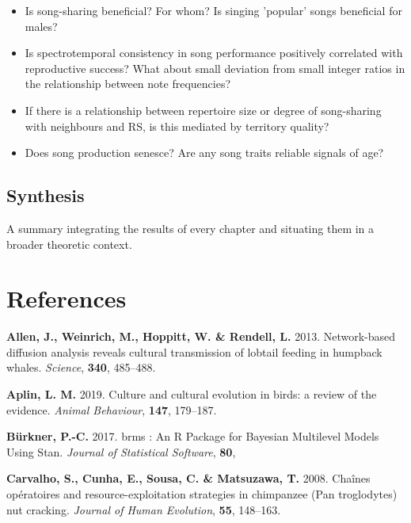 \documentclass[]{report}
\providecommand{\tightlist}{%
  \setlength{\itemsep}{0pt}\setlength{\parskip}{0pt}}
\begin{document}
\begin{itemize}
\tightlist
\item
  Is song-sharing beneficial? For whom? Is singing 'popular' songs
  beneficial for males?
\item
  Is spectrotemporal consistency in song performance positively
  correlated with reproductive success? What about small deviation from
  small integer ratios in the relationship between note frequencies?
\item
  If there is a relationship between repertoire size or degree of
  song-sharing with neighbours and RS, is this mediated by territory
  quality?
\item
  Does song production senesce? Are any song traits reliable signals of
  age?
\end{itemize}

\hypertarget{synthesis}{%
\section{Synthesis}\label{synthesis}}

A summary integrating the results of every chapter and situating them in
a broader theoretic context.

\hypertarget{references}{%
\chapter*{References}\label{references}}

\hypertarget{refs}{}
\leavevmode\hypertarget{ref-Allen2013a}{}%
\textbf{Allen, J., Weinrich, M., Hoppitt, W. \& Rendell, L.} 2013.
Network-based diffusion analysis reveals cultural transmission of
lobtail feeding in humpback whales. \emph{Science}, \textbf{340},
485--488.

\leavevmode\hypertarget{ref-Aplin2018}{}%
\textbf{Aplin, L. M.} 2019. Culture and cultural evolution in birds: a
review of the evidence. \emph{Animal Behaviour}, \textbf{147}, 179--187.

\leavevmode\hypertarget{ref-Burkner2017a}{}%
\textbf{Bürkner, P.-C.} 2017. brms : An R Package for Bayesian
Multilevel Models Using Stan. \emph{Journal of Statistical Software},
\textbf{80},

\leavevmode\hypertarget{ref-Carvalho2008}{}%
\textbf{Carvalho, S., Cunha, E., Sousa, C. \& Matsuzawa, T.} 2008.
Chaînes opératoires and resource-exploitation strategies in chimpanzee
(Pan troglodytes) nut cracking. \emph{Journal of Human Evolution},
\textbf{55}, 148--163.
\end{document}
